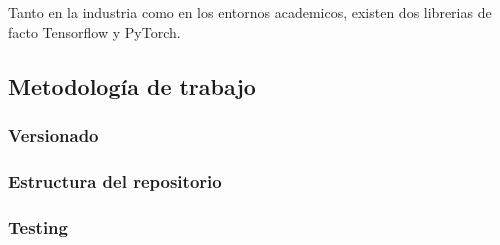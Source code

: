 Tanto en la industria como en los entornos academicos, existen dos librerias de facto Tensorflow y PyTorch. \\



\subsection{Metodología de trabajo}

\subsubsection{Versionado}
\subsubsection{Estructura del repositorio}
\subsubsection{Testing}
